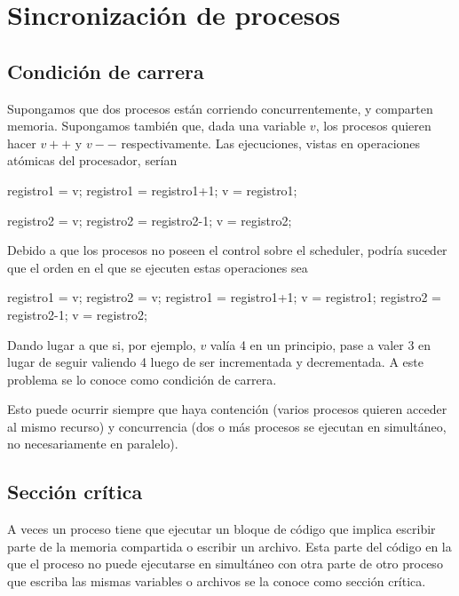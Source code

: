\documentclass{article}
\begin{document}
\section{Sincronizaci\'on de procesos}

\subsection{Condici\'on de carrera}

Supongamos que dos procesos est\'an corriendo concurrentemente, y comparten memoria. Supongamos tambi\'en que, dada una variable $v$, los procesos quieren hacer $v++$ y $v--$ respectivamente. Las ejecuciones, vistas en operaciones at\'omicas del procesador, ser\'ian

\begin{code}
registro1 = v;
registro1 = registro1+1;
v = registro1;
\end{code}

\begin{code}
registro2 = v;
registro2 = registro2-1;
v = registro2;
\end{code}

Debido a que los procesos no poseen el control sobre el scheduler, podr\'ia suceder que el orden en el que se ejecuten estas operaciones sea

\begin{code}
registro1 = v;
registro2 = v;
registro1 = registro1+1;
v = registro1;
registro2 = registro2-1;
v = registro2;
\end{code}

Dando lugar a que si, por ejemplo, $v$ val\'ia 4 en un principio, pase a valer 3 en lugar de seguir valiendo 4 luego de ser incrementada y decrementada. A este problema se lo conoce como condici\'on de carrera.

Esto puede ocurrir siempre que haya contenci\'on (varios procesos quieren acceder al mismo recurso) y concurrencia (dos o m\'as procesos se ejecutan en simult\'aneo, no necesariamente en paralelo).

\subsection{Secci\'on cr\'itica}

A veces un proceso tiene que ejecutar un bloque de c\'odigo que implica escribir parte de la memoria compartida o escribir un archivo. Esta parte del c\'odigo en la que el proceso no puede ejecutarse en simult\'aneo con otra parte de otro proceso que escriba las mismas variables o archivos se la conoce como secci\'on cr\'itica.
\end{document}
